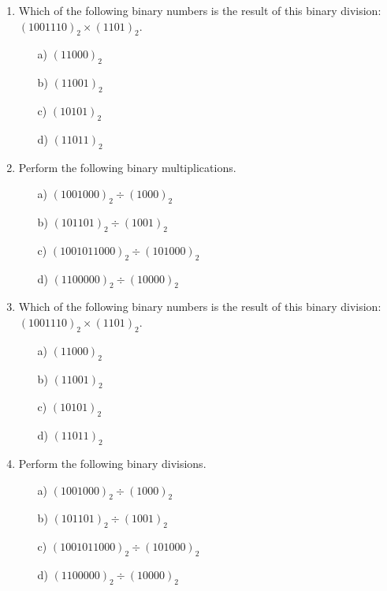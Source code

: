\documentclass[]{article}
\begin{document}
\begin{enumerate}
\item Which of the following binary numbers is the result of this binary division: $(1001110)_{2}\times ( 1101 )_{2}$. %
\begin{multicols}{2}
\begin{itemize}
\item[a)] $(11000)_{2}$ %
\item[b)] $(11001)_{2}$ %
\item[c)] $(10101)_{2}$ %
\item[d)] $(11011)_2$ %
\end{itemize}
\end{multicols}



\item Perform the following binary multiplications.
\begin{multicols}{2}
\begin{itemize}
\item[a)] $(1001000)_{2} \div ( 1000)_{2}$
\item[b)] $(101101)_{2} \div (1001)_{2}$
\item[c)] $(1001011000)_{2} \div (101000)_{2}$
\item[d)] $(1100000)_{2} \div (10000)_{2}$
\end{itemize}
\end{multicols}

		
	\item Which of the following binary numbers is the result of this binary division: $(1001110)_{2}\times ( 1101 )_{2}$. %
\begin{multicols}{2}
\begin{itemize}
\item[a)] $(11000)_{2}$ %
\item[b)] $(11001)_{2}$ %
\item[c)] $(10101)_{2}$ %
\item[d)] $(11011)_2$ %
\end{itemize}
\end{multicols}


\item Perform the following binary divisions.
\begin{multicols}{2}
\begin{itemize}
\item[a)] $(1001000)_{2} \div ( 1000)_{2}$
\item[b)] $(101101)_{2} \div (1001)_{2}$
\item[c)] $(1001011000)_{2} \div (101000)_{2}$
\item[d)] $(1100000)_{2} \div (10000)_{2}$
\end{itemize}
\end{multicols}



\end{enumerate}
\end{document}
